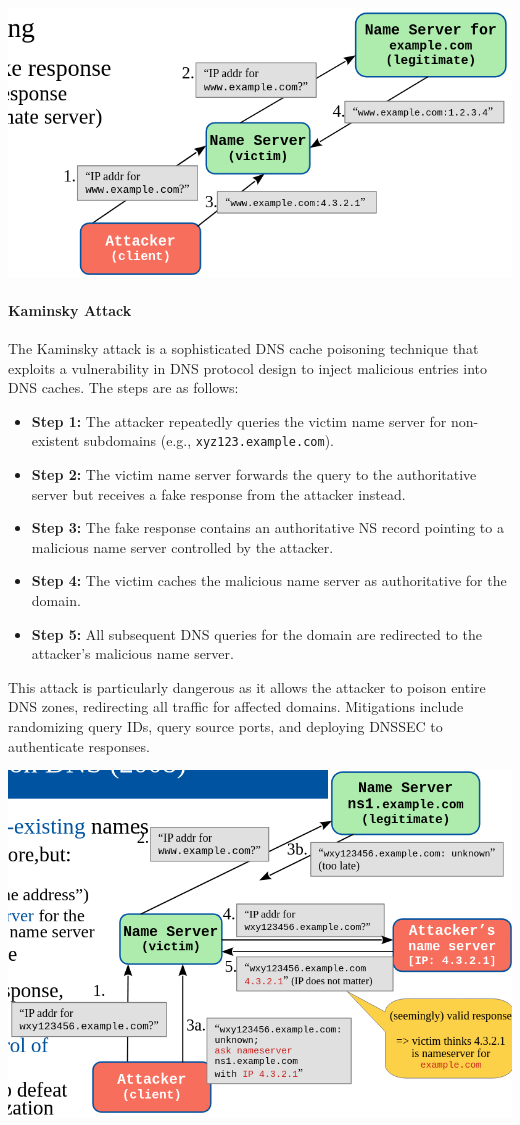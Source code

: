 \includegraphics[width=0.7\columnwidth]{Resources/dns_poison2.png}

\paragraph{Kaminsky Attack}
The Kaminsky attack is a sophisticated DNS cache poisoning technique that exploits a vulnerability in DNS protocol design to inject malicious entries into DNS caches. The steps are as follows:
\begin{itemize}
    \item \textbf{Step 1:} The attacker repeatedly queries the victim name server for non-existent subdomains (e.g., \texttt{xyz123.example.com}).
    \item \textbf{Step 2:} The victim name server forwards the query to the authoritative server but receives a fake response from the attacker instead.
    \item \textbf{Step 3:} The fake response contains an authoritative NS record pointing to a malicious name server controlled by the attacker.
    \item \textbf{Step 4:} The victim caches the malicious name server as authoritative for the domain.
    \item \textbf{Step 5:} All subsequent DNS queries for the domain are redirected to the attacker's malicious name server.
\end{itemize}
This attack is particularly dangerous as it allows the attacker to poison entire DNS zones, redirecting all traffic for affected domains. Mitigations include randomizing query IDs, query source ports, and deploying DNSSEC to authenticate responses.

\includegraphics[width=0.6\columnwidth]{Resources/kaminsky.png}

